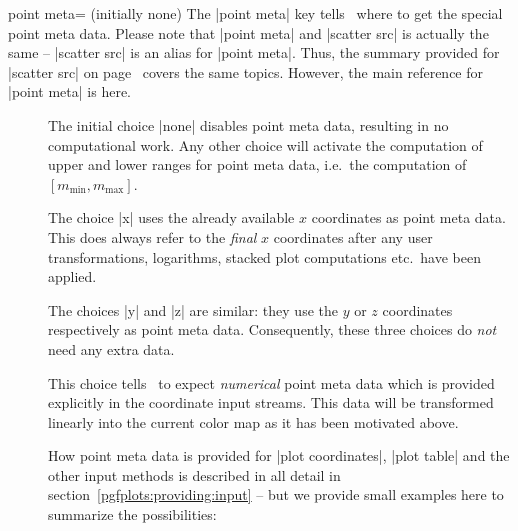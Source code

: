 \begin{codeexample}[]
\end{codeexample}

\begin{pgfplotskey}{point meta= (initially none)}
	\label{pgfplots:pointmeta}
	The |point meta| key tells \PGFPlots\ where to get the special point meta data. Please note that |point meta| and |scatter src| is actually the same -- |scatter src| is an alias for |point meta|. Thus, the summary provided for |scatter src| on page~\pageref{pgfplots:scatter:src} covers the same topics. However, the main reference for |point meta| is here.
	
	\begin{description}
		\item[] The initial choice |none| disables point meta data, resulting in no computational work. Any other choice will activate the computation of upper and lower ranges for point meta data, i.e.\ the computation of $[m_{\text{min}},m_{\text{max}}]$. 

		\item[] The choice |x| uses the already available $x$ coordinates as point meta data. This does always refer to the \emph{final} $x$ coordinates after any user transformations, logarithms, stacked plot computations etc.\ have been applied.

		\item[]
		\item[]
			 The choices |y| and |z| are similar: they use the $y$ or $z$ coordinates respectively as point meta data. Consequently, these three choices do \emph{not} need any extra data.

		\item[] This choice tells \PGFPlots\ to expect \emph{numerical} point meta data which is provided explicitly in the coordinate input streams. This data will be transformed linearly into the current color map as it has been motivated above.
		
		How point meta data is provided for |plot coordinates|, |plot table| and the other input methods is described in all detail in section~\ref{pgfplots:providing:input} -- but we provide small examples here to summarize the possibilities:
\begin{codeexample}
\end{codeexample}
\end{description}
\end{pgfplotskey}
